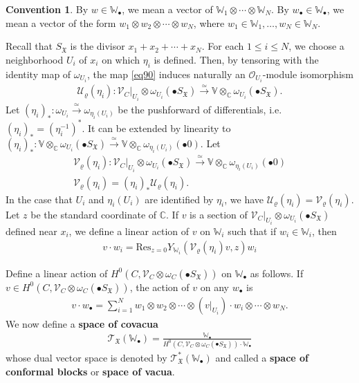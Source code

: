 \documentclass[12pt,b5paper,notitlepage]{report}
\theoremstyle{definition}
\newtheorem{cv}[df]{Convention}
\theoremstyle{plain}
\newcommand{\fk}{\mathfrak}
\newcommand{\mc}{\mathcal}
\newcommand{\Res}{\mathrm{Res}}
\newcommand{\scr}{\mathscr}
\newcommand{\blt}{\bullet}
\newcommand{\Vbb}{\mathbb V}
\newcommand{\Wbb}{\mathbb W}
\newcommand{\Cbb}{\mathbb C}
\numberwithin{equation}{section}
\begin{document}
\begin{cv}
By $w\in\Wbb_\blt$, we mean a vector of $\Wbb_1\otimes\cdots\otimes \Wbb_N$. \index{w@$w_\blt,\Wbb_\blt$} By $w_\blt\in \Wbb_\blt$, we mean a vector of the form $w_1\otimes w_2\otimes\cdots\otimes w_N$, where $w_1\in \Wbb_1,\dots,w_N\in\Wbb_N$.
\end{cv}



Recall that $S_{\fk X}$ is the divisor $x_1+x_2+\cdots+x_N$. For each $1\leq i\leq N$, we choose a neighborhood $U_i$ of $x_i$ on which $\eta_i$ is defined. Then, by tensoring with the identity map of $\omega_{U_i}$,  the map \eqref{eq90} induces naturally an $\scr O_{U_i}$-module isomorphism 
\begin{align*}
\mc U_\varrho(\eta_i):\scr V_C|_{U_i}\otimes\omega_{U_i}(\blt S_{\fk X})\xrightarrow{\simeq}\Vbb\otimes_{\Cbb}\omega_{U_i}(\blt S_{\fk X}).
\end{align*}
Let $(\eta_i)_*:\omega_{U_i}\xrightarrow{\simeq}\omega_{\eta_i(U_i)}$  be the pushforward of differentials, i.e. $(\eta_i)_*=(\eta_i^{-1})^*$. It can be extended by linearity to $(\eta_i)_*:\Vbb\otimes_{\Cbb}\omega_{U_i}(\blt S_{\fk X})\xrightarrow{\simeq}\Vbb\otimes_{\Cbb}\omega_{\eta_i(U_i)}(\blt 0)$. Let
\begin{gather}
\mc V_\varrho(\eta_i):\scr V_C|_{U_i}\otimes\omega_{U_i}(\blt S_{\fk X})\xrightarrow{\simeq}\Vbb\otimes_{\Cbb}\omega_{\eta_i(U_i)}(\blt 0)\nonumber\\
\mc V_{\varrho}(\eta_i)=(\eta_i)_*\mc U_{\varrho}(\eta_i).\label{eq233}
\end{gather}
In the case that $U_i$ and $\eta_i(U_i)$ are identified by $\eta_i$, we have $\mc U_\varrho(\eta_i)=\mc V_\varrho(\eta_i)$. Let $z$ be the standard coordinate of $\Cbb$. If $v$ is a section of $\scr V_C|_{U_i}\otimes\omega_{U_i}(\blt S_{\fk X})$ defined near $x_i$, we define a linear action of $v$ on $\Wbb_i$ such that if $w_i\in\Wbb_i$, \index{vw@$v\cdot w_i,v\cdot w_\blt$} then
\begin{align}
\boxed{~~v\cdot w_i=\Res_{z=0}Y_{\Wbb_i}(\mc V_\varrho(\eta_i)v,z)w_i~~}\label{eq230}
\end{align}


Define a linear action of $H^0(C,\scr V_C\otimes\omega_C(\blt S_{\fk X}))$ on $\Wbb_\blt$ as follows.  
If $v\in H^0(C,\scr V_C\otimes\omega_C(\blt S_{\fk X}))$, the action of $v$ on any $w_\blt$ is
\begin{align}
v\cdot w_\blt=\sum_{i=1}^N w_1\otimes w_2\otimes\cdots \otimes (v|_{U_i})\cdot w_i \otimes\cdots\otimes w_N.\label{eq231}
\end{align}
We now define a \textbf{space of covacua} 
\begin{gather}
\scr T_{\fk X}(\Wbb_\blt)=\frac{\Wbb_\blt}{H^0(C,\scr V_C\otimes\omega_C(\blt S_{\fk X}))\cdot \Wbb_\blt}
\end{gather}
whose dual vector space is denoted by $\scr T_{\fk X}^*(\Wbb_\blt)$ \index{T@$\scr T_{\fk X}(\Wbb_\blt),\scr T_{\fk X}^*(\Wbb_\blt)$} and called a \textbf{space of conformal blocks} or \textbf{space of vacua}.
\end{document}
